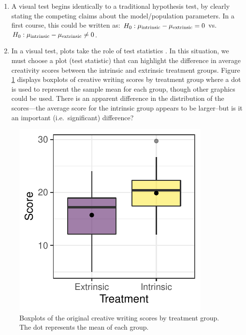 \documentclass[12pt]{article}
\begin{document}
\begin{enumerate}
\def\labelenumi{\arabic{enumi}.}
\item
  A visual test begins identically to a traditional hypothesis test, by
  clearly stating the competing claims about the model/population
  parameters. In a first course, this could be written as:
  \(H_0: \mu_{\rm intrinsic} - \mu_{\rm extrinsic} = 0\)
  vs.~\(H_0: \mu_{\rm intrinsic} - \mu_{\rm extrinsic} \ne 0\).
\item
  In a visual test, plots take the role of test statistics
  \citep{Buja-2009bd}. In this situation, we must choose a plot (test
  statistic) that can highlight the difference in average creativity
  scores between the intrinsic and extrinsic treatment groups. Figure
  \ref{fig:data_plot} displays boxplots of creative writing scores by
  treatment group where a dot is used to represent the sample mean for
  each group, though other graphics could be used. There is an apparent
  difference in the distribution of the scores---the average score for
  the intrinsic group appears to be larger--but is it an important
  (i.e.~significant) difference?
\end{enumerate}

\begin{figure}
\centering
\includegraphics{figs/diff_means_plot.pdf}
\caption{\label{fig:data_plot} Boxplots of the original creative writing
scores by treatment group. The dot represents the mean of each group.}
\end{figure}
\end{document}
